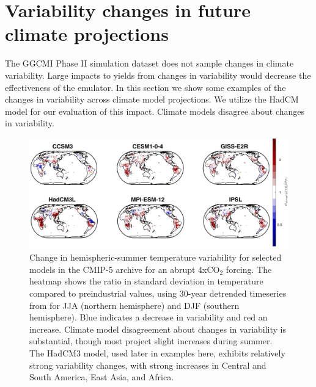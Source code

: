 \documentclass[12pt]{article}
\begin{document}
\clearpage
\section{Variability changes in future climate projections}
\begin{flushleft}
The GGCMI Phase II simulation dataset does not sample changes in climate variability. Large impacts to yields from changes in variability would decrease the effectiveness of the emulator.
In this section we show some examples of the changes in variability across climate model projections. We utilize the HadCM model for our evaluation of this impact.
Climate models disagree about changes in variability.
\end{flushleft}

\begin{figure}[h!]
  \centering
  \includegraphics[width = 16.3cm]{tas_Amon_LRM6_abrupt4x_control_LF_maps_JJA_final.png}
  \caption{
	  Change in hemispheric-summer temperature variability for selected models in the CMIP-5 archive for an abrupt 4xCO$_2$ forcing. The heatmap shows the ratio in standard deviation in temperature compared to preindustrial values, using 30-year detrended timeseries from for JJA (northern hemisphere) and DJF (southern hemisphere).  %
    Blue indicates a decrease in variability and red an increase.
   Climate model disagreement about changes in variability is substantial, though most project slight increases during summer. The HadCM3 model, used later in examples here, exhibits relatively strong variability changes, with strong increases in Central and South America, East Asia, and Africa.
  }
  \label{fig:lpjmlrcp}
\end{figure}
\end{document}
